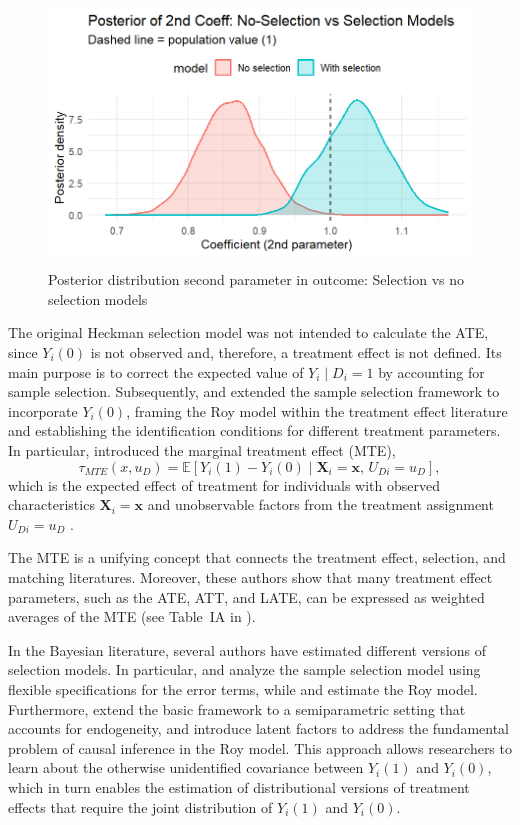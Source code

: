 \begin{figure}[h!]
	\includegraphics[width=340pt, height=200pt]{Chapters/chapter12/figures/FigSEL.png}
	\caption[List of figure caption goes here]{Posterior distribution second parameter in outcome: Selection vs no selection models}\label{fig12_SEL}
\end{figure}
  
The original Heckman selection model was not intended to calculate the ATE, since $Y_i(0)$ is not observed and, therefore, a treatment effect is not defined. Its main purpose is to correct the expected value of $Y_i \mid D_i=1$ by accounting for sample selection. Subsequently, \cite{heckman1990varieties} and \cite{heckman2005structural} extended the sample selection framework to incorporate $Y_i(0)$, framing the Roy model \cite{roy1951some} within the treatment effect literature and establishing the identification conditions for different treatment parameters. In particular, \cite{heckman2005structural} introduced the marginal treatment effect (MTE),
\[
\tau_{MTE}(x,u_D) = \mathbb{E}[Y_i(1)-Y_i(0)\mid \mathbf{X}_i=\mathbf{x}, \, U_{Di}=u_D],
\]
which is the expected effect of treatment for individuals with observed characteristics $\mathbf{X}_i=\mathbf{x}$ and unobservable factors from the treatment assignment $U_{Di}=u_D$ \cite{heckman2005structural}.

The MTE is a unifying concept that connects the treatment effect, selection, and matching literatures. Moreover, these authors show that many treatment effect parameters, such as the ATE, ATT, and LATE, can be expressed as weighted averages of the MTE (see Table~IA in \cite{heckman2005structural}).

In the Bayesian literature, several authors have estimated different versions of selection models. In particular, \cite{van2011bayesian} and \cite{ding2014bayesian} analyze the sample selection model using flexible specifications for the error terms, while \cite{koop1997learning} and \cite{chib2007analysis} estimate the Roy model. Furthermore, \cite{chib2009estimation} extend the basic framework to a semiparametric setting that accounts for endogeneity, and \cite{heckman2014treatment} introduce latent factors to address the fundamental problem of causal inference in the Roy model. This approach allows researchers to learn about the otherwise unidentified covariance between $Y_i(1)$ and $Y_i(0)$, which in turn enables the estimation of distributional versions of treatment effects that require the joint distribution of $Y_i(1)$ and $Y_i(0)$.

